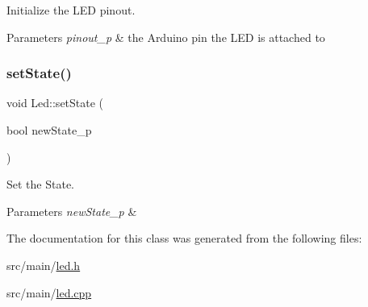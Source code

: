 Initialize the L\+ED pinout. 


\begin{DoxyParams}{Parameters}
{\em pinout\+\_\+p} & the Arduino pin the L\+ED is attached to \\
\hline
\end{DoxyParams}
\mbox{\label{class_led_a9136de456f7df8e202e880312767a566}} 
\subsubsection{\texorpdfstring{set\+State()}{setState()}}
{\footnotesize\ttfamily void Led\+::set\+State (\begin{DoxyParamCaption}\item[{bool}]{new\+State\+\_\+p }\end{DoxyParamCaption})}



Set the State. 


\begin{DoxyParams}{Parameters}
{\em new\+State\+\_\+p} & \\
\hline
\end{DoxyParams}


The documentation for this class was generated from the following files\+:\begin{DoxyCompactItemize}
\item 
src/main/\hyperlink{led_8h}{led.\+h}\item 
src/main/\hyperlink{led_8cpp}{led.\+cpp}\end{DoxyCompactItemize}
